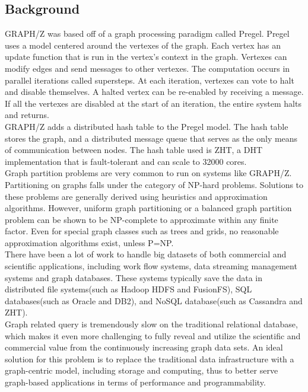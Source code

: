 \documentclass[10pt]{article}
\begin{document}
\begin{multicols}{2} 
  \section{Background}
  GRAPH/Z was based off of a graph processing paradigm called Pregel. Pregel uses a model centered around the vertexes of the graph.\cite{Gz:1}  Each vertex has an update function that is run in the vertex's context in the graph. Vertexes can modify edges and send messages to other vertexes.\cite{Gz:1} The computation occurs in parallel iterations called supersteps.\cite{Gz:1} At each iteration, vertexes can vote to halt and disable themselves. A halted vertex can be re-enabled by receiving a message. If all the vertexes are disabled at the start of an iteration, the entire system halts and returns.\\
  GRAPH/Z adds a distributed hash table to the Pregel model. The hash table stores the graph, and a distributed message queue that serves as the only means of communication between nodes. The hash table used is ZHT, a DHT implementation that is fault-tolerant and can scale to 32000 cores.\cite{Gz:2}\\
  Graph partition problems are very common to run on systems like GRAPH/Z. Partitioning on graphs falls under the category of NP-hard problems. Solutions to these problems are generally derived using heuristics and approximation algorithms. However, uniform graph partitioning or a balanced graph partition problem can be shown to be NP-complete to approximate within any finite factor. Even for special graph classes such as trees and grids, no reasonable approximation algorithms exist, unless P=NP.\\
  There have been a lot of work to handle big datasets of both commercial and scientific applications, including work flow systems, data streaming management systems and graph databases. These systems typically save the data in distributed file systems(such as Hadoop HDFS and FusionFS), SQL databases(such as Oracle and DB2), and NoSQL database(such as Cassandra and ZHT).\\
  Graph related query is tremendously slow on the traditional relational database, which makes it even more challenging to fully reveal and utilize the scientific and commercial value from the continuously increasing graph data sets. An ideal solution for this problem is to replace the traditional data infrastructure with a graph-centric model, including storage and computing, thus to better serve graph-based applications in terms of performance and programmability.\\

\end{multicols}
\end{document}
